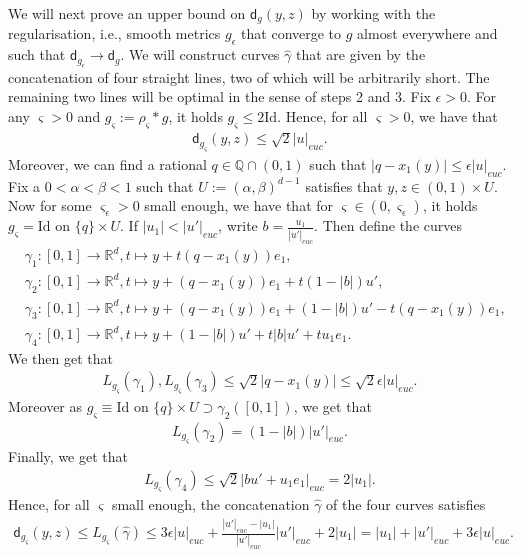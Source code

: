\documentclass[a4paper,10pt]{article}
\numberwithin{equation}{section}
\newcommand{\R}{\mathbb{R}}
\newcommand{\Q}{\mathbb{Q}}
\newcommand{\sfd}{\mathsf d}
\begin{document}
We will next prove an upper bound on $\sfd_g(y,z)$ by working with the regularisation, i.e., smooth metrics $g_\epsilon$ that converge to $g$ almost everywhere and such that $\sfd_{g_\epsilon} \to \sfd_g$. We will construct curves $\hat{\gamma}$ that are given by the concatenation of four straight lines, two of which will be arbitrarily short. The remaining two lines will be optimal in the sense of steps 2 and 3. 
Fix $\epsilon >0$. For any $\varsigma >0$ and $g_\varsigma := \rho_{\varsigma} * g$, it holds $g_\varsigma \leq 2 \mathrm{Id}$. Hence, for all $\varsigma>0$, we have that
\begin{align*}
    \sfd_{g_\varsigma}(y,z) \leq \sqrt{2}|u|_{euc}.
\end{align*}
Moreover, we can find a rational $q \in \Q\cap (0,1)$ such that $|q-x_1(y)| \leq \epsilon|u|_{euc}$. 
Fix a $0<\alpha < \beta <1$ such that $U:= (\alpha,\beta)^{d-1}$ satisfies that $y, z \in (0,1) \times U$. 
Now for some $\varsigma_\epsilon >0$ small enough, we have that for $\varsigma \in (0, \varsigma_\epsilon)$, it holds $g_\varsigma =\mathrm{Id}$ on $\{q\} \times U$. If $|u_1|< |u'|_{euc}$, write $b= \frac{u_1}{|u'|_{euc}}$. Then define the curves
\begin{align*}
    &\gamma_1:[0,1] \to \R^d, t \mapsto y+t(q-x_1(y))e_1, \\
    &\gamma_2:[0,1] \to \R^d, t \mapsto y+(q-x_1(y))e_1 + t(1-|b|)u', \\
    &\gamma_3:[0,1] \to \R^d, t \mapsto  y+(q-x_1(y))e_1 + (1-|b|)u'-t(q-x_1(y))e_1, \\
    &\gamma_4:[0,1] \to \R^d, t \mapsto  y + (1-|b|)u' + t|b|u'+tu_1e_1.
\end{align*}
We then get that 
\begin{align*}
    L_{g_\varsigma}(\gamma_1), L_{g_\varsigma}(\gamma_3) \leq \sqrt{2}|q-x_1(y)| \leq \sqrt{2}\epsilon|u|_{euc}.
\end{align*}
Moreover as $g_\varsigma \equiv \mathrm{Id}$ on $\{q\} \times U \supset \gamma_2([0,1])$, we get that 
\begin{align*}
     L_{g_\varsigma}(\gamma_2) = (1-|b|)|u'|_{euc}.
\end{align*}
Finally, we get that 
\begin{align*}
 L_{g_\varsigma}(\gamma_4) \leq \sqrt{2}\big|bu'+ u_1e_1\big|_{euc}= 2|u_1|.
\end{align*}
Hence, for all $\varsigma$ small enough, the concatenation $\hat{\gamma}$ of the four curves satisfies
\begin{align}
    \sfd_{g_\varsigma}(y, z) \leq L_{g_\varsigma}(\hat{\gamma}) \leq 3\epsilon|u|_{euc} + \frac{|u'|_{euc}-|u_1|}{|u'|_{euc}}|u'|_{euc} + 2|u_1| = |u_1| + |u'|_{euc} +3\epsilon|u|_{euc}.
\end{align}
\end{document}
